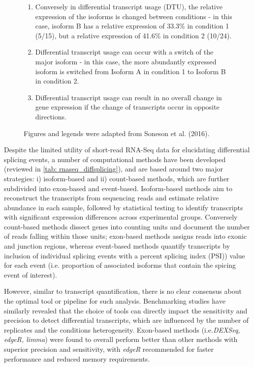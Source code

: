 \begin{figure}[htp]
{\begin{enumerate}[label=\textbf{\Alph*})]
		\item Conversely in differential transcript usage (DTU), the relative expression of the isoforms is changed between conditions - in this case, isoform B has a relative expression of 33.3\% in condition 1 (5/15), but a relative expression of 41.6\% in condition 2 (10/24).
		\item Differential transcript usage can occur with a switch of the major isoform - in this case, the more abundantly expressed isoform is switched from Isoform A in condition 1 to Isoform B in condition 2. 
		\item Differential transcript usage can result in no overall change in gene expression if the change of transcripts occur in opposite directions.
		\\
	\end{enumerate} 
	Figures and legends were adapted from Soneson et al. (2016)\cite{Soneson2016}. 
   }
	\label{fig:dte_dtu_explanation}
\end{figure}

Despite the limited utility of short-read RNA-Seq data for elucidating differential splicing events, a number of computational methods have been developed (reviewed in \cref{tab: rnaseq_diffsplicing}), and are based around two major strategies: i) isoform-based and ii) count-based methods, which are further subdivided into exon-based and event-based. Isoform-based methods aim to reconstruct the transcripts from sequencing reads and estimate relative abundance in each sample, followed by statistical testing to identify transcripts with significant expression differences across experimental groups\cite{Mehmood2020}. Conversely count-based methods dissect genes into counting units and document the number of reads falling within those units\cite{Mehmood2020}; exon-based methods assigns reads into exonic and junction regions, whereas event-based methods quantify transcripts by inclusion of individual splicing events with a percent splicing index (PSI)) value for each event (i.e. proportion of associated isoforms that contain the spicing event of interest). 

However, similar to transcript quantification, there is no clear consensus about the optimal tool or pipeline for such analysis. Benchmarking studies have similarly revealed that the choice of tools can directly impact the sensitivity and precision to detect differential transcripts, which are influenced by the number of replicates and the conditions heterogeneity\cite{Merino2019}. Exon-based methods (i.e.\textit{DEXSeq, edgeR, limma}) were found to overall perform better than other methods with superior precision and sensitivity, with \textit{edgeR} recommended for faster performance and reduced memory requirements\cite{Mehmood2020}. 


